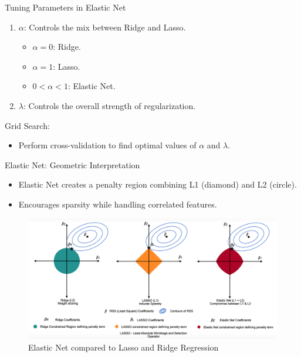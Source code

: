 \documentclass[
  ignorenonframetext,
]{beamer}
\providecommand{\tightlist}{%
  \setlength{\itemsep}{0pt}\setlength{\parskip}{0pt}}\usepackage{longtable,booktabs,array}
\begin{document}
\begin{frame}{Tuning Parameters in Elastic Net}
\label{tuning-parameters-in-elastic-net}
\begin{enumerate}
\tightlist
\item
  \textbf{\(\alpha\)}: Controls the mix between Ridge and Lasso.

  \begin{itemize}
  \tightlist
  \item
    \(\alpha = 0\): Ridge.
  \item
    \(\alpha = 1\): Lasso.
  \item
    \(0 < \alpha < 1\): Elastic Net.
  \end{itemize}
\item
  \textbf{\(\lambda\)}: Controls the overall strength of regularization.
\end{enumerate}

\begin{block}{Grid Search:}
\label{grid-search}
\begin{itemize}
\tightlist
\item
  Perform cross-validation to find optimal values of \(\alpha\) and
  \(\lambda\).
\end{itemize}
\end{block}
\end{frame}

\begin{frame}{Elastic Net: Geometric Interpretation}
\label{elastic-net-geometric-interpretation}
\begin{itemize}
\tightlist
\item
  Elastic Net creates a penalty region combining L1 (diamond) and L2
  (circle).
\item
  Encourages sparsity while handling correlated features.
\end{itemize}

\begin{figure}[H]

{\centering \includegraphics{visualization_Elastic.png}

}

\caption{Elastic Net compared to Lasso and Ridge Regression}

\end{figure}%
\end{frame}
\end{document}
